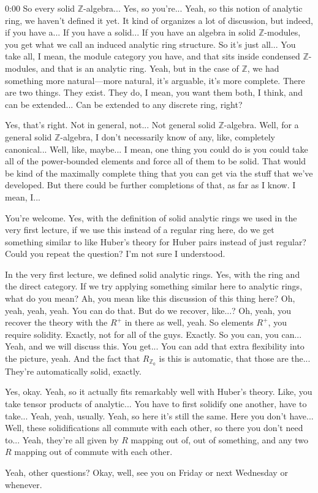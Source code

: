 \begin{unfinished}{0:00}
So every solid $\mathbb{Z}$-algebra... Yes, so you're... Yeah, so this notion of analytic ring, we haven't defined it yet. It kind of organizes a lot of discussion, but indeed, if you have a... If you have a solid... If you have an algebra in solid $\mathbb{Z}$-modules, you get what we call an induced analytic ring structure. So it's just all... You take all, I mean, the module category you have, and that sits inside condensed $\mathbb{Z}$-modules, and that is an analytic ring. Yeah, but in the case of $\mathbb{Z}$, we had something more natural---more natural, it's arguable, it's more complete. There are two things. They exist. They do, I mean, you want them both, I think, and can be extended... Can be extended to any discrete ring, right?

Yes, that's right. Not in general, not... Not general solid $\mathbb{Z}$-algebra. Well, for a general solid $\mathbb{Z}$-algebra, I don't necessarily know of any, like, completely canonical... Well, like, maybe... I mean, one thing you could do is you could take all of the power-bounded elements and force all of them to be solid. That would be kind of the maximally complete thing that you can get via the stuff that we've developed. But there could be further completions of that, as far as I know. I mean, I...

You're welcome. Yes, with the definition of solid analytic rings we used in the very first lecture, if we use this instead of a regular ring here, do we get something similar to like Huber's theory for Huber pairs instead of just regular? Could you repeat the question? I'm not sure I understood.

In the very first lecture, we defined solid analytic rings. Yes, with the ring and the direct category. If we try applying something similar here to analytic rings, what do you mean? Ah, you mean like this discussion of this thing here? Oh, yeah, yeah, yeah. You can do that. But do we recover, like...? Oh, yeah, you recover the theory with the $R^+$ in there as well, yeah. So elements $R^+$, you require solidity. Exactly, not for all of the guys. Exactly. So you can, you can... Yeah, and we will discuss this. You get... You can add that extra flexibility into the picture, yeah. And the fact that $R_{\mathbb{Z}_0}$ is this is automatic, that those are the... They're automatically solid, exactly.

Yes, okay. Yeah, so it actually fits remarkably well with Huber's theory. Like, you take tensor products of analytic... You have to first solidify one another, have to take... Yeah, yeah, usually. Yeah, so here it's still the same. Here you don't have... Well, these solidifications all commute with each other, so there you don't need to... Yeah, they're all given by $R$ mapping out of, out of something, and any two $R$ mapping out of commute with each other.

Yeah, other questions? Okay, well, see you on Friday or next Wednesday or whenever.

\end{unfinished}